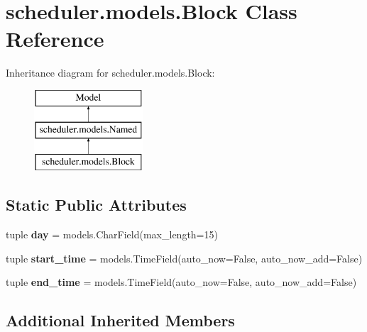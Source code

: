 \hypertarget{classscheduler_1_1models_1_1_block}{\section{scheduler.\-models.\-Block Class Reference}
\label{classscheduler_1_1models_1_1_block}
}
Inheritance diagram for scheduler.\-models.\-Block\-:\begin{figure}[H]
\begin{center}
\leavevmode
\includegraphics[height=3.000000cm]{classscheduler_1_1models_1_1_block}
\end{center}
\end{figure}
\subsection*{Static Public Attributes}
\begin{DoxyCompactItemize}
\item 
\hypertarget{classscheduler_1_1models_1_1_block_a74bca3976000aa8a38e295d6c824e4e7}{tuple {\bfseries day} = models.\-Char\-Field(max\-\_\-length=15)}\label{classscheduler_1_1models_1_1_block_a74bca3976000aa8a38e295d6c824e4e7}

\item 
\hypertarget{classscheduler_1_1models_1_1_block_ad67c2a879438a7ae068c1bc98a9c3da8}{tuple {\bfseries start\-\_\-time} = models.\-Time\-Field(auto\-\_\-now=False, auto\-\_\-now\-\_\-add=False)}\label{classscheduler_1_1models_1_1_block_ad67c2a879438a7ae068c1bc98a9c3da8}

\item 
\hypertarget{classscheduler_1_1models_1_1_block_a6df5a07bc90a852842bdd830fefe1459}{tuple {\bfseries end\-\_\-time} = models.\-Time\-Field(auto\-\_\-now=False, auto\-\_\-now\-\_\-add=False)}\label{classscheduler_1_1models_1_1_block_a6df5a07bc90a852842bdd830fefe1459}

\end{DoxyCompactItemize}
\subsection*{Additional Inherited Members}



